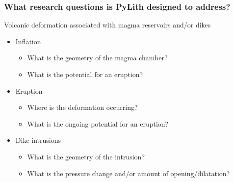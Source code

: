 \documentclass[aspectratio=169]{beamer}
\begin{document}
\begin{frame}
  \frametitle{What research questions is PyLith designed to address?}

  \vfill
  Volcanic deformation associated with magma reservoirs and/or dikes
  \vfill
  
  \begin{itemize}
  \item Inflation
    \begin{itemize}
    \item What is the geometry of the magma chamber?
    \item What is the potential for an eruption?
    \end{itemize}
  \item Eruption
    \begin{itemize}
    \item Where is the deformation occurring?
    \item What is the ongoing potential for an eruption?
    \end{itemize}
  \item Dike intrusions
    \begin{itemize}
    \item What is the geometry of the intrusion?
    \item What is the pressure change and/or amount of opening/dilatation?
    \end{itemize}
  \end{itemize}
  \vfill

\end{frame}
\end{document}
